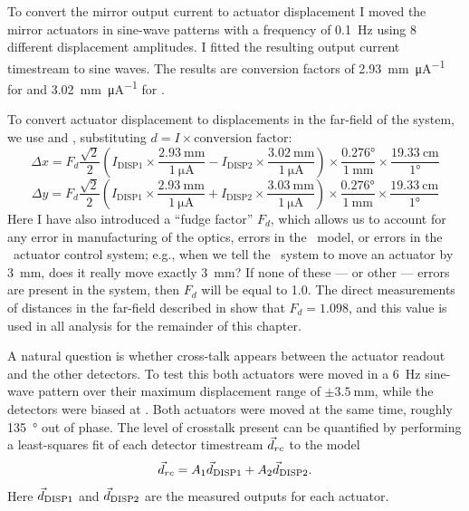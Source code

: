 To convert the mirror output current to actuator displacement I moved the mirror actuators in sine-wave patterns with a frequency of \SI{0.1}{\Hz} using 8 different displacement amplitudes.
I fitted the resulting output current timestream to sine waves.
The results are conversion factors of \SI{2.93}{\mm\per\uA} for  and \SI{3.02}{\mm\per\uA} for .

To convert actuator displacement to displacements in the far-field of the system, we use  and , substituting $d = I \times \text{conversion factor}$:
\begin{equation}
\Delta x = F_d \frac{\sqrt{2}}{2} \left( I_{\text{DISP1}} \times \frac{\SI{2.93}{\mm}}{\SI{1}{\uA}} -
                              I_{\text{DISP2}} \times \frac{\SI{3.02}{\mm}}{\SI{1}{\uA}}  \right) \times
    \frac{\ang{0.276}} {\SI{1}{\mm}} \times
    \frac{\SI{19.33}{\cm}} {\ang{1}}
\end{equation}
\begin{equation}
\Delta y = F_d \frac{\sqrt{2}}{2} \left( I_{\text{DISP1}} \times \frac{\SI{2.93}{\mm}}{\SI{1}{\uA}} +
                              I_{\text{DISP2}} \times \frac{\SI{3.03}{\mm}}{\SI{1}{\uA}}  \right) \times
    \frac{\ang{0.276}} {\SI{1}{\mm}} \times
    \frac{\SI{19.33}{\cm}} {\ang{1}}
\end{equation}
Here I have also introduced a ``fudge factor'' $F_d$, which allows us to account for any error in manufacturing of the optics, errors in the \ZEMAX\ model, or errors in the \BOSE\ actuator control system; e.g., when we tell the \BOSE\ system to move an actuator by \SI{3}{\mm}, does it really move exactly \SI{3}{\mm}?
If none of these --- or other --- errors are present in the system, then $F_d$ will be equal to 1.0.
The direct measurements of distances in the far-field described in  show that $F_d = 1.098$, and this value is used in all analysis for the remainder of this chapter.


A natural question is whether cross-talk appears between the actuator readout and the other detectors.
To test this both actuators were moved in a \SI{6}{\Hz} sine-wave pattern over their maximum displacement range of $\pm\SI{3.5}{\mm}$, while the detectors were biased at \SOC.
Both actuators were moved at the same time, roughly \SI{135}{\degree} out of phase.
The level of crosstalk present can be quantified by performing a least-squares fit of each detector timestream $\vec{d}_{rc}$ to the model
\begin{equation}
	 \vec{d}_{rc} = A_1 \vec{d}_{\text{DISP1}} + A_2 \vec{d}_{\text{DISP2}}.
\end{equation}
Here $\vec{d}_{\text{DISP1}}$ and $\vec{d}_{\text{DISP2}}$ are the measured outputs for each actuator.

